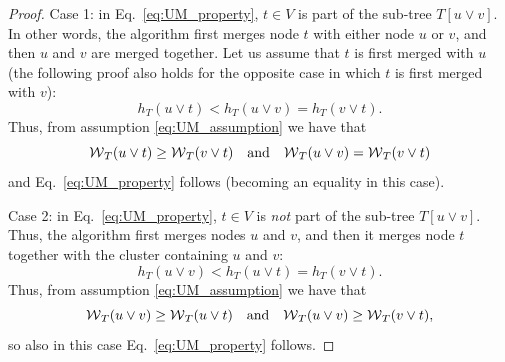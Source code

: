 \begin{proof}
Case 1: in Eq.~\ref{eq:UM_property}, $t\in V$ is part of the sub-tree ${T[u \vee v]}$. In other words, the algorithm first merges node $t$ with either node $u$ or $v$, and then $u$ and $v$ are merged together. Let us assume that $t$ is first merged with $u$ (the following proof also holds for the opposite case in which $t$ is first merged with $v$):
\begin{equation}
h_T(u \vee t) < h_T(u \vee v) = h_T(v \vee t).
\end{equation}
Thus, from assumption \ref{eq:UM_assumption} we have that
\begin{equation}
\mathcal{W}{}_{T}(u \vee t) \geq \mathcal{W}{}_{T}(v \vee t) \quad  \text{and} \quad \mathcal{W}{}_{T}(u \vee v) = \mathcal{W}{}_{T}(v \vee t)
\end{equation}
and Eq.~\ref{eq:UM_property} follows (becoming an equality in this case).

Case 2: in Eq.~\ref{eq:UM_property}, $t\in V$ is \emph{not} part of the sub-tree ${T[u \vee v]}$. Thus, the algorithm first merges nodes $u$ and $v$, and then it merges node $t$ together with the cluster containing $u$ and $v$:
\begin{equation}
h_T(u \vee v) < h_T(u \vee t) = h_T(v \vee t).
\end{equation}
Thus, from assumption \ref{eq:UM_assumption} we have that
\begin{equation}
\mathcal{W}{}_{T}(u \vee v) \geq \mathcal{W}{}_{T}(u \vee t) \quad  \text{and} \quad \mathcal{W}{}_{T}(u \vee v) \geq \mathcal{W}{}_{T}(v \vee t),
\end{equation}
so also in this case Eq.~\ref{eq:UM_property} follows.


\end{proof}
